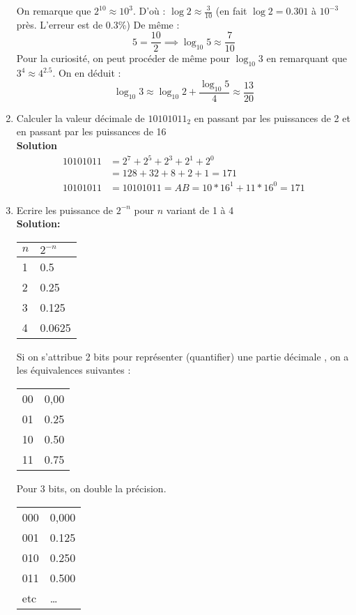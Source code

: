 \documentclass[a4paper,11pt]{article}
\begin{document}
\begin{enumerate}
On remarque que $2^{10}\approx 10^3$. D'où : $\log 2\approx \frac{3}{10}$ (en fait $\log 2=0.301$ à $10^{-3}$ près. L'erreur est de 0.3\%)
De même :
$$5=\frac{10}{2} \implies \log_{10} 5 \approx \frac{7}{10}$$
Pour la curiosité, on peut procéder de même pour $\log_{10} 3$ en remarquant que $3^4\approx 4^2.5$. On en déduit :
$$\log_{10} 3 \approx \log_{10}2+\frac{\log_{10}5}{4}\approx \frac{13}{20}$$


\item{Calculer la valeur décimale de $10101011_2$ en passant par les puissances de 2 et en passant par les puissances de 16}\\

{\bf Solution}
\begin{align}
10101011 &= 2^7 + 2^5 + 2^3+ 2^1 + 2^0 \nonumber\\
         & = 128 +32 +8 +2 +1 = 171 \nonumber \\
10101011 &= 1010 1011 = AB= 10*16^1 + 11*16^0 = 171 \nonumber
\end{align}

\item{Ecrire les puissance de $2^{-n}$ pour $n$ variant de 1 à 4}\\

{\bf Solution:}
\begin{center}
  \begin{tabular}{|l|l|}
    \hline
    $n$ & $2^{-n}$ \\
    \hline \hline
    1 & 0.5 \\
    2 & 0.25 \\
    3 & 0.125 \\
    4 & 0.0625 \\
     \hline
  \end{tabular}
\end{center}

Si on s'attribue 2 bits pour représenter (quantifier) une partie décimale , on a les équivalences suivantes :
\begin{center}
  \begin{tabular}{l|l}
    00 & 0,00 \\
    01 & 0.25 \\
    10 & 0.50 \\
    11 & 0.75 \\
  \end{tabular}
\end{center}

Pour 3 bits, on double la précision.
\begin{center}
  \begin{tabular}{l|l}
    000 & 0,000 \\
    001 & 0.125 \\
    010 & 0.250 \\
    011 & 0.500 \\
    etc & \dots
  \end{tabular}
\end{center}

\end{enumerate}
\end{document}
